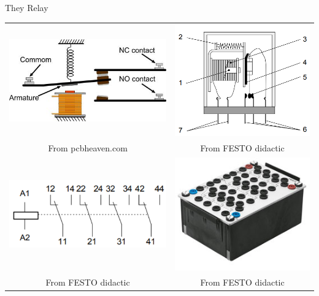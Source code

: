 \documentclass[presentation,aspectratio=1610]{beamer}
\begin{document}
\begin{frame}[label={sec:orgea6201f}]{They Relay}
\begin{center}
\begin{tabular}{cc}
\includegraphics[width=0.4\linewidth]{../../figures/howrelayswork.jpg} &
\includegraphics[width=0.3\linewidth]{../../figures/festo-relay-principle.png}\\
{\tiny From pcbheaven.com} & {\tiny From FESTO didactic}\\
\includegraphics[width=0.35\linewidth]{../../figures/festo-relay-switches.png} &
\includegraphics[width=0.25\linewidth]{../../figures/festo-relay-box.jpg}\\
{\tiny From FESTO didactic} & {\tiny From FESTO didactic}\\
\end{tabular}
\end{center}
\end{frame}
\end{document}
